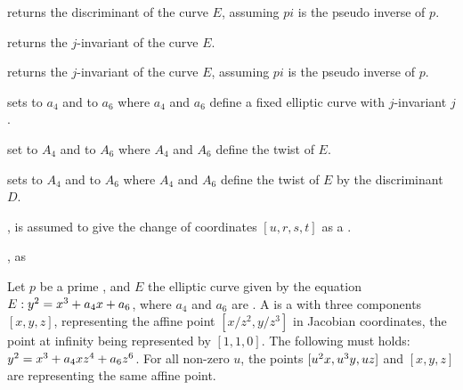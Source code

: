 returns the discriminant of the curve $E$, assuming $pi$ is the pseudo inverse
of $p$.

returns the $j$-invariant of the curve $E$.

returns the $j$-invariant of the curve $E$, assuming $pi$ is the pseudo inverse
of $p$.

sets  to $a_4$ and  to $a_6$ where $a_4$ and $a_6$
define a fixed elliptic curve with $j$-invariant $j$.

set  to $A_4$ and  to $A_6$ where $A_4$ and $A_6$
define the twist of $E$.

sets  to $A_4$ and  to $A_6$ where $A_4$ and $A_6$
define the twist of $E$ by the discriminant $D$.










,  is assumed
to give the change of coordinates $[u,r,s,t]$ as a .

, as 


Let $p$ be a prime , and $E$ the elliptic curve given by the
equation $E:y^2=x^3+a_4\*x+a_6$, where $a_4$ and $a_6$ are .
A  is a  with three components $[x,y,z]$, representing
the affine point $[x/z^2,y/z^3]$ in Jacobian coordinates, the point at
infinity being represented by $[1, 1, 0]$. The following must holds:
$y^2=x^3+a_4\*x\*z^4+a_6\*z^6$. For all non-zero $u$, the points
$[u^2\*x,u^3\*y,u\*z]$ and $[x,y,z]$ are representing the same affine point.

